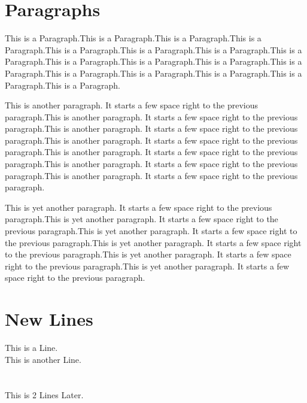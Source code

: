 \documentclass[10pt]{article}
\begin{document}
\section{Paragraphs}

This is a Paragraph.This is a Paragraph.This is a Paragraph.This is a Paragraph.This is a Paragraph.This is a Paragraph.This is a Paragraph.This is a Paragraph.This is a Paragraph.This is a Paragraph.This is a Paragraph.This is a Paragraph.This is a Paragraph.This is a Paragraph.This is a Paragraph.This is a Paragraph.This is a Paragraph.

This is another paragraph. It starts a few space right to the previous
paragraph.This is another paragraph. It starts a few space right to the previous paragraph.This is another paragraph. It starts a few space right to the previous paragraph.This is another paragraph. It starts a few space right to the previous paragraph.This is another paragraph. It starts a few space right to the previous paragraph.This is another paragraph. It starts a few space right to the previous paragraph.This is another paragraph. It starts a few space right to the previous paragraph.

This is yet another paragraph. It starts a few space right to the previous paragraph.This is yet another paragraph. It starts a few space right to the previous paragraph.This is yet another paragraph. It starts a few space right to the previous paragraph.This is yet another paragraph. It starts a few space right to the previous paragraph.This is yet another paragraph. It starts a few space right to the previous paragraph.This is yet another paragraph. It starts a few space right to the previous paragraph.

\section{New Lines}
This is a Line.\\
This is another Line.\\\\\\
This is 2 Lines Later.
\end{document}
